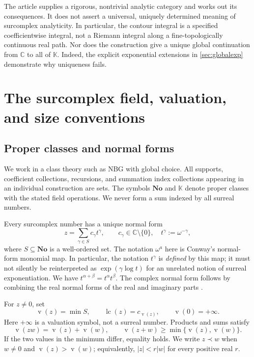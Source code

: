 \documentclass[11pt,letterpaper]{article}
\numberwithin{equation}{section}
\theoremstyle{definition}
\theoremstyle{remark}
\newcommand{\No}{\mathbf{No}}
\newcommand{\K}{\mathbb{K}}
\newcommand{\C}{\mathbb{C}}
\newcommand{\val}{\operatorname{v}}
\newcommand{\lead}{\operatorname{lc}}
\begin{document}
The article supplies a rigorous, nontrivial analytic category and works out its
consequences. It does not assert a universal, uniquely determined meaning of
surcomplex analyticity. In particular, the contour integral is a specified
coefficientwise integral, not a Riemann integral along a fine-topologically
continuous real path. Nor does the construction give a unique global
continuation from $\C$ to all of $\K$. Indeed, the explicit exponential
extensions in \cref{sec:globalexp} demonstrate why uniqueness fails.

\section{The surcomplex field, valuation, and size conventions}\label{sec:field}

\subsection{Proper classes and normal forms}

We work in a class theory such as NBG with global choice. All supports,
coefficient collections, recursions, and summation index collections appearing
in an individual construction are sets. The symbols $\No$ and $\K$ denote
proper classes with the stated field operations. We never form a sum indexed
by all surreal numbers.

Every surcomplex number has a unique normal form
\begin{equation}\label{eq:normal}
 z=\sum_{\gamma\in S}c_\gamma t^\gamma,
 \qquad c_\gamma\in\C\setminus\{0\},\quad
 t^\gamma:=\omega^{-\gamma},
\end{equation}
where $S\subseteq\No$ is a well-ordered set. The notation $\omega^a$ here is
Conway's normal-form monomial map. In particular, the notation $t^\gamma$ is
\emph{defined} by this map; it must not silently be reinterpreted as
$\exp(\gamma\log t)$ for an unrelated notion of surreal exponentiation.
We have $t^{\alpha+\beta}=t^\alpha t^\beta$.
The complex normal form follows by combining the real normal forms of the
real and imaginary parts \cite{Conway,Alling}.

For $z\ne0$, set
\[
 \val(z)=\min S,\qquad \lead(z)=c_{\val(z)},\qquad \val(0)=+\infty.
\]
Here $+\infty$ is a valuation symbol, not a surreal number. Products and sums
satisfy
\begin{equation}\label{eq:valuation}
 \val(zw)=\val(z)+\val(w),\qquad
 \val(z+w)\ge\min\{\val(z),\val(w)\}.
\end{equation}
If the two values in the minimum differ, equality holds. We write
$z\prec w$ when $w\ne0$ and $\val(z)>\val(w)$; equivalently,
$|z|<r|w|$ for every positive real $r$.
\end{document}
